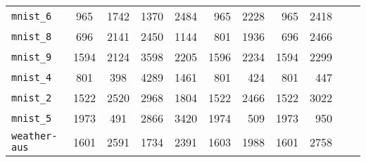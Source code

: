\begin{tabular}{lccrrrrrrrr}
\texttt{mnist\_6} & 965 & 1742 & 1370 & 2484 & 965 & 2228 & 965 & 2418\\
\texttt{mnist\_8} & 696 & 2141 & 2450 & 1144 & 801 & 1936 & 696 & 2466\\
\texttt{mnist\_9} & 1594 & 2124 & 3598 & 2205 & 1596 & 2234 & 1594 & 2299\\
\texttt{mnist\_4} & 801 & 398 & 4289 & 1461 & 801 & 424 & 801 & 447\\
\texttt{mnist\_2} & 1522 & 2520 & 2968 & 1804 & 1522 & 2466 & 1522 & 3022\\
\texttt{mnist\_5} & 1973 & 491 & 2866 & 3420 & 1974 & 509 & 1973 & 950\\
\texttt{weather-aus} & 1601 & 2591 & 1734 & 2391 & 1603 & 1988 & 1601 & 2758\\
\bottomrule
\end{tabular}
